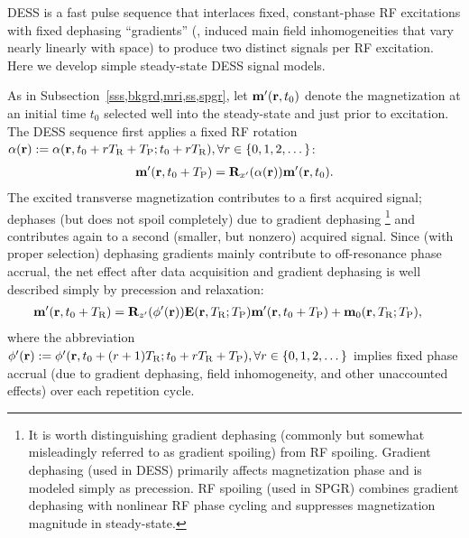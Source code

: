 DESS \cite{redpath:88:fan,bruder:88:ans}
is a fast pulse sequence 
that interlaces fixed, constant-phase RF excitations
with fixed dephasing ``gradients''
(\ie, induced main field inhomogeneities 
that vary nearly linearly with space)
to produce two distinct signals
per RF excitation.
Here we develop simple 
steady-state DESS signal models.

As in Subsection~\ref{sss,bkgrd,mri,ss,spgr},
let $\bmmp\prtz$ denote the magnetization
at an initial time $t_0$ 
selected well into the steady-state
and just prior to excitation.
The DESS sequence first applies
a fixed RF rotation
$\flip\pr := \flip\paren{\bmr,t_0+\rep\TR+\TP;t_0+\rep\TR},
\forall r \in \set{0,1,2,\dots}$:
\begin{align}
	\bmmp\paren{\bmr,t_0+\TP} = \bmRxp{\flip{\pr}} \bmmp\prtz.
	\label{eq:dess-ex}
\end{align}
The excited transverse magnetization
contributes to a first acquired signal;
dephases (but does not spoil completely) 
due to gradient dephasing
\footnote{It is worth distinguishing 
gradient dephasing
(commonly 
but somewhat misleadingly 
referred to as gradient spoiling)
from RF spoiling.
Gradient dephasing
(used in DESS)
primarily affects magnetization phase
and is modeled simply as precession.
RF spoiling
(used in SPGR)
combines gradient dephasing 
with nonlinear RF phase cycling
and suppresses magnetization magnitude 
in steady-state.
}
and contributes again to a second 
(smaller, but nonzero) acquired signal.
Since (with proper selection) 
dephasing gradients mainly contribute 
to off-resonance phase accrual,
the net effect
after data acquisition
and gradient dephasing
is well described 
simply by precession and relaxation:
\begin{align}
	\bmmp\paren{\bmr,t_0+\TR} &= 
	\bmRzp{\php\paren{\bmr}} \bmE\paren{\bmr,\TR;\TP} \bmmp\paren{\bmr,t_0+\TP} +
	\bmmzero\paren{\bmr,\TR;\TP},
	\label{eq:dess-pr}
\end{align}
where the abbreviation
$\php\pr := \php\paren{\bmr,t_0+\paren{\rep+1}\TR;t_0+\rep\TR+\TP},
\forall \rep \in \set{0,1,2,\dots}$
implies fixed phase accrual 
(due to gradient dephasing, 
field inhomogeneity, 
and other unaccounted effects)
over each repetition cycle.

